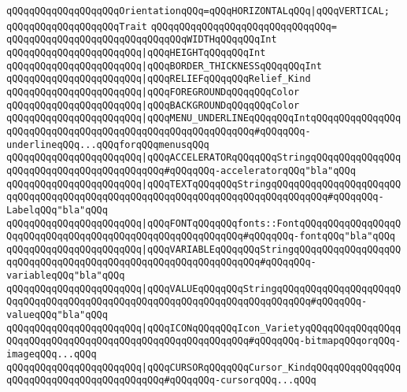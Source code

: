 \verb|qQQqqQQqqQQqqQQqqQQqOrientationqQQq=qQQqHORIZONTALqQQq|\verb#|qQQqVERTICAL;#\newline
\newline
\verb|qQQqqQQqqQQqqQQqqQQqTrait|\newline
\verb|qQQqqQQqqQQqqQQqqQQqqQQqqQQqqQQq=|\newline
\verb|qQQqqQQqqQQqqQQqqQQqqQQqqQQqqQQqWIDTHqQQqqQQqInt|\newline
\verb|qQQqqQQqqQQqqQQqqQQqqQQq|\verb#|qQQqHEIGHTqQQqqQQqInt#\newline
\verb|qQQqqQQqqQQqqQQqqQQqqQQq|\verb#|qQQqBORDER_THICKNESSqQQqqQQqInt#\newline
\verb|qQQqqQQqqQQqqQQqqQQqqQQq|\verb#|qQQqRELIEFqQQqqQQqRelief_Kind#\newline
\verb|qQQqqQQqqQQqqQQqqQQqqQQq|\verb#|qQQqFOREGROUNDqQQqqQQqColor#\newline
\verb|qQQqqQQqqQQqqQQqqQQqqQQq|\verb#|qQQqBACKGROUNDqQQqqQQqColor#\newline
\verb|qQQqqQQqqQQqqQQqqQQqqQQq|\verb#|qQQqMENU_UNDERLINEqQQqqQQqIntqQQqqQQqqQQqqQQqqQQqqQQqqQQqqQQqqQQqqQQqqQQqqQQqqQQqqQQqqQQq#\verb|#qQQqqQQq-underlineqQQq...qQQqforqQQqmenusqQQq|\newline
\verb|qQQqqQQqqQQqqQQqqQQqqQQq|\verb#|qQQqACCELERATORqQQqqQQqStringqQQqqQQqqQQqqQQqqQQqqQQqqQQqqQQqqQQqqQQqqQQq#\verb|#qQQqqQQq-acceleratorqQQq"bla"qQQq|\newline
\verb|qQQqqQQqqQQqqQQqqQQqqQQq|\verb#|qQQqTEXTqQQqqQQqStringqQQqqQQqqQQqqQQqqQQqqQQqqQQqqQQqqQQqqQQqqQQqqQQqqQQqqQQqqQQqqQQqqQQqqQQqqQQqqQQq#\verb|#qQQqqQQq-LabelqQQq"bla"qQQq|\newline
\verb|qQQqqQQqqQQqqQQqqQQqqQQq|\verb#|qQQqFONTqQQqqQQqfonts::FontqQQqqQQqqQQqqQQqqQQqqQQqqQQqqQQqqQQqqQQqqQQqqQQqqQQqqQQqqQQq#\verb|#qQQqqQQq-fontqQQq"bla"qQQq|\newline
\verb|qQQqqQQqqQQqqQQqqQQqqQQq|\verb#|qQQqVARIABLEqQQqqQQqStringqQQqqQQqqQQqqQQqqQQqqQQqqQQqqQQqqQQqqQQqqQQqqQQqqQQqqQQqqQQqqQQq#\verb|#qQQqqQQq-variableqQQq"bla"qQQq|\newline
\verb|qQQqqQQqqQQqqQQqqQQqqQQq|\verb#|qQQqVALUEqQQqqQQqStringqQQqqQQqqQQqqQQqqQQqqQQqqQQqqQQqqQQqqQQqqQQqqQQqqQQqqQQqqQQqqQQqqQQqqQQqqQQq#\verb|#qQQqqQQq-valueqQQq"bla"qQQq|\newline
\verb|qQQqqQQqqQQqqQQqqQQqqQQq|\verb#|qQQqICONqQQqqQQqIcon_VarietyqQQqqQQqqQQqqQQqqQQqqQQqqQQqqQQqqQQqqQQqqQQqqQQqqQQqqQQqqQQq#\verb|#qQQqqQQq-bitmapqQQqorqQQq-imageqQQq...qQQq|\newline
\verb|qQQqqQQqqQQqqQQqqQQqqQQq|\verb#|qQQqCURSORqQQqqQQqCursor_KindqQQqqQQqqQQqqQQqqQQqqQQqqQQqqQQqqQQqqQQqqQQq#\verb|#qQQqqQQq-cursorqQQq...qQQq|\newline
